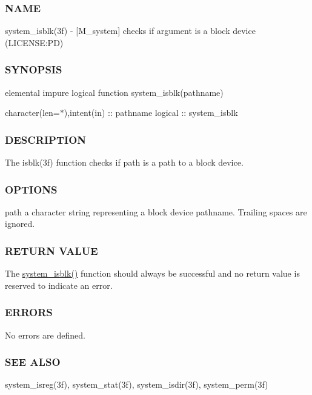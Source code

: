 \subsubsection*{N\+A\+ME}

system\+\_\+isblk(3f) -\/ \mbox{[}M\+\_\+system\mbox{]} checks if argument is a block device (L\+I\+C\+E\+N\+SE\+:PD) 

\subsubsection*{S\+Y\+N\+O\+P\+S\+IS}

elemental impure logical function system\+\_\+isblk(pathname)

character(len=$\ast$),intent(in) \+:\+: pathname logical \+:\+: system\+\_\+isblk

\subsubsection*{D\+E\+S\+C\+R\+I\+P\+T\+I\+ON}

The isblk(3f) function checks if path is a path to a block device.

\subsubsection*{O\+P\+T\+I\+O\+NS}

path a character string representing a block device pathname. Trailing spaces are ignored.

\subsubsection*{R\+E\+T\+U\+RN V\+A\+L\+UE}

The \mbox{\hyperlink{namespacem__system_a1294b8d8b4910261c0a0991bf668ab67}{system\+\_\+isblk()}} function should always be successful and no return value is reserved to indicate an error.

\subsubsection*{E\+R\+R\+O\+RS}

No errors are defined.

\subsubsection*{S\+EE A\+L\+SO}

system\+\_\+isreg(3f), system\+\_\+stat(3f), system\+\_\+isdir(3f), system\+\_\+perm(3f)


